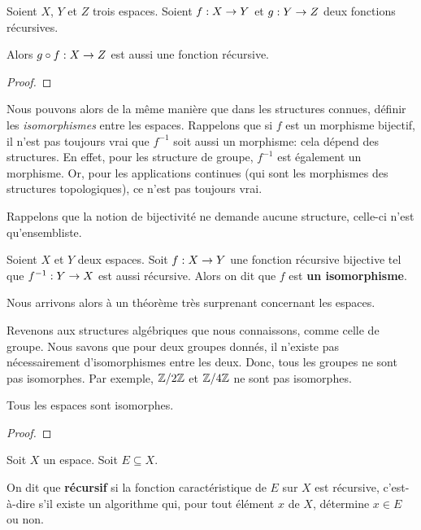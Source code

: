 \begin{proposition}
	Soient $X$, $Y$ et $Z$ trois espaces.
	Soient $f : X \rightarrow Y$ et $g : Y \rightarrow Z$ deux fonctions
	récursives.

	Alors $g \circ f : X \rightarrow Z$ est aussi une fonction récursive.
\end{proposition}

\ifdefined\outproof
\begin{proof}

\end{proof}
\fi

Nous pouvons alors de la même manière que dans les structures connues, définir
les \textit{isomorphismes} entre les espaces.
Rappelons que si $f$ est un morphisme bijectif, il n'est pas toujours vrai que
$f^{-1}$ soit aussi un morphisme: cela dépend des structures. En effet, pour les
structure de groupe, $f^{-1}$ est également un morphisme. Or, pour les
applications continues (qui sont les morphismes des structures topologiques),
ce n'est pas toujours vrai.

Rappelons que la notion de bijectivité ne demande aucune structure, celle-ci
n'est qu'ensembliste.

\begin{definition}
	Soient $X$ et $Y$ deux espaces.
	Soit $f : X \rightarrow Y$ une fonction récursive bijective tel que
	$f^{-1} : Y \rightarrow X$ est aussi récursive.
	Alors on dit que $f$ est \textbf{un isomorphisme}.
\end{definition}

Nous arrivons alors à un théorème très surprenant concernant les espaces.

Revenons aux structures algébriques que nous connaissons, comme celle de groupe.
Nous savons que pour deux groupes donnés, il n'existe pas nécessairement
d'isomorphismes entre les deux. Donc, tous les groupes ne sont pas isomorphes.
Par exemple, $\mathbb{Z}/2\mathbb{Z}$ et $\mathbb{Z}/4\mathbb{Z}$ ne sont pas
isomorphes.

\begin{theorem}
	\label{theorem:isomorphism_theorem}
	Tous les espaces sont isomorphes.
\end{theorem}

\ifdefined\outputproof
\begin{proof}

\end{proof}
\fi

\begin{definition}
	Soit $X$ un espace. Soit $E \subseteq X$.

	On dit que \textbf{récursif} si la fonction caractéristique de $E$ sur $X$
	est récursive, c'est-à-dire s'il existe un algorithme qui, pour tout élément
	$x$ de $X$, détermine $x \in E$ ou non.
\end{definition}


